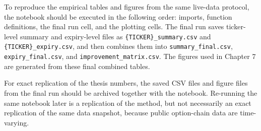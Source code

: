 \documentclass[11pt,a4paper]{report}
\begin{document}
To reproduce the empirical tables and figures from the same live-data protocol, the notebook should be executed in the following order: imports, function definitions, the final run cell, and the plotting cells. The final run saves ticker-level summary and expiry-level files as \texttt{\{TICKER\}\_summary.csv} and \texttt{\{TICKER\}\_expiry.csv}, and then combines them into \texttt{summary\_final.csv}, \texttt{expiry\_final.csv}, and \texttt{improvement\_matrix.csv}. The figures used in Chapter 7 are generated from these final combined tables.

For exact replication of the thesis numbers, the saved CSV files and figure files from the final run should be archived together with the notebook. Re-running the same notebook later is a replication of the method, but not necessarily an exact replication of the same data snapshot, because public option-chain data are time-varying.
\end{document}
